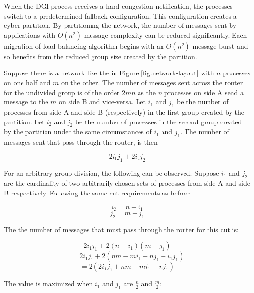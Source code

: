 When the \ac{DGI} process receives a hard congestion notification, the processes switch to a predetermined fallback configuration.
This configuration creates a cyber partition.
By partitioning the network, the number of messages sent by applications with $O(n^2)$ message complexity can be reduced significantly.
Each migration of load balancing algorithm begins with an $O(n^2)$ message burst and so benefits from the reduced group size created by the partition.

Suppose there is a network like the in Figure \ref{fig:network-layout} with $n$ processes on one half and $m$ on the other.
The number of messages sent across the router for the undivided group is of the order $2mn$ as the $n$ processes on side A send a message to the $m$ on side B and vice-versa.
Let $i_{1}$ and $j_{1}$ be the number of processes from side A and side B (respectively) in the first group created by the partition.
Let $i_{2}$ and $j_{2}$ be the number of processes in the second group created by the partition under the same circumstances of $i_1$ and $j_1$.
The number of messages sent that pass through the router, is then 

\begin{equation}
2 i_{1} j_{1} + 2 i_{2} j_{2}
\end{equation}

For an arbitrary group division, the following can be observed.
Suppose $i_{1}$ and $j_{2}$ are the cardinality of two arbitrarily chosen sets of processes from side A and side B respectively.
Following the same cut requirements as before:

\begin{equation}
i_2 = n - i_1
\end{equation}
\begin{equation}
j_2 = m - j_1
\end{equation}

The the number of messages that must pass through the router for this cut is:

\begin{equation}
2 i_{1} j_{1} + 2 (n-i_{1}) (m-j_{1})
\end{equation}
\begin{equation}
= 2 i_{1} j_{1} + 2 (nm - mi_{1} - nj_{1} + i_{1}j_{1})
\end{equation}
\begin{equation}
= 2 (2 i_{1} j_{1} + nm - mi_{1} - nj_{1})
\end{equation}

The value is maximized when $i_1$ and $j_1$ are $\frac{n}{2}$ and $\frac{m}{2}$:


